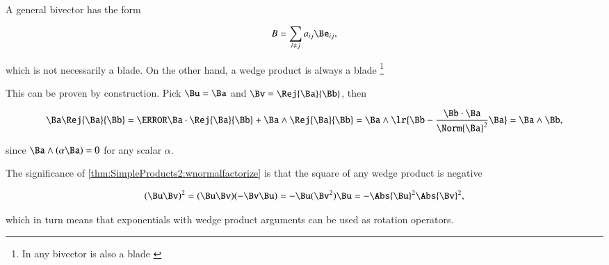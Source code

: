 %
%
A general bivector has the form

\begin{dmath}\label{eqn:normalFactorization:1800}
B = \sum_{i \ne j} a_{ij} \Be_{ij},
\end{dmath}

which is not necessarily a blade.
On the other hand, a wedge product is always a blade
\footnote{In  any bivector is also a blade \citep{ablamowicz2004lectures:chapter1}}


This can be proven by construction.
Pick \( \Bu = \Ba \) and \( \Bv = \Rej{\Ba}{\Bb} \), then

\begin{dmath}\label{eqn:normalFactorization:1840}
\Ba \Rej{\Ba}{\Bb}
=
\cancel{\Ba \cdot \Rej{\Ba}{\Bb}}
+
\Ba \wedge \Rej{\Ba}{\Bb}
=
\Ba \wedge \lr{ \Bb - \frac{\Bb \cdot \Ba}{\Norm{\Ba}^2} \Ba }
=
\Ba \wedge \Bb,
\end{dmath}

since \( \Ba \wedge (\alpha \Ba) = 0 \) for any scalar \( \alpha \).

The significance of \cref{thm:SimpleProducts2:wnormalfactorize} is that the square of any wedge product is negative

\begin{dmath}\label{eqn:normalFactorization:1820}
(\Bu \Bv)^2
=
(\Bu \Bv) (-\Bv \Bu)
=
-\Bu (\Bv^2) \Bu
=
- \Abs{\Bu}^2 \Abs{\Bv}^2,
\end{dmath}

which in turn means that exponentials with wedge product arguments can be used as rotation operators.


